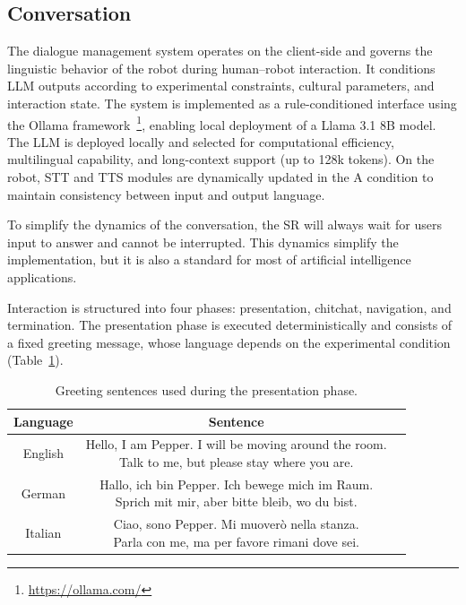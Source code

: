 \subsection{Conversation}
\label{ch6:sec:conversation}

The dialogue management system operates on the client-side and governs the linguistic behavior of the robot during human--robot interaction. It conditions LLM outputs according to experimental constraints, cultural parameters, and interaction state. The system is implemented as a rule-conditioned interface using the Ollama framework~\footnote{\href{https://ollama.com/}{https://ollama.com/}}, enabling local deployment of a Llama 3.1 8B model.
The LLM is deployed locally and selected for computational efficiency, multilingual capability, and long-context support (up to 128k tokens). On the robot, STT and TTS modules are dynamically updated in the A condition to maintain consistency between input and output language.

To simplify the dynamics of the conversation, the SR will always wait for users input to answer and cannot be interrupted. 
This dynamics simplify the implementation, but it is also a standard for most of artificial intelligence applications.

Interaction is structured into four phases: presentation, chitchat, navigation, and termination. The presentation phase is executed deterministically and consists of a fixed greeting message, whose language depends on the experimental condition (Table~\ref{ch6:tab:greetings}).

%
\begin{table}[]
\centering
\begin{tabular}{c|c|c}
\textbf{Language}  & \textbf{Sentence} \\
\toprule
English  & \makecell{Hello, I am Pepper. I will be moving around the room.\\ Talk to me, but please stay where you are.} \\
\midrule
German & \makecell{Hallo, ich bin Pepper. Ich bewege mich im Raum.\\ Sprich mit mir, aber bitte bleib, wo du bist.}\\
\midrule
Italian  & \makecell{Ciao, sono Pepper. Mi muoverò nella stanza.\\ Parla con me, ma per favore rimani dove sei.}\\
\bottomrule
\end{tabular}
\caption{Greeting sentences used during the presentation phase.}
\label{ch6:tab:greetings}
\end{table}
%

